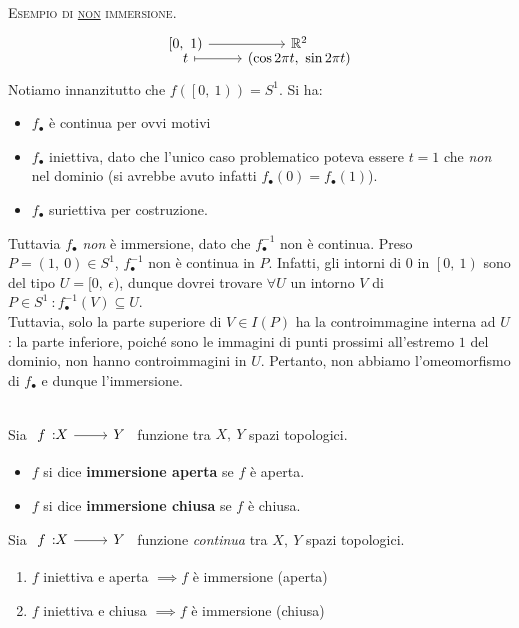 \begin{example} \textsc{Esempio di \underline{non} immersione.}
	\begin{equation}
		\funztot{\ }{\left[0,\ 1\right)}{\realset^2}{t}{\left(\cos 2\pi t,\ \sin 2\pi t\right)}
	\end{equation}
Notiamo innanzitutto che $f\left(\left[0,\ 1\right)\right)=S^{1}$. Si ha:
\begin{itemize}
\item $f_{\bullet}$ è continua per ovvi motivi
\item $f_{\bullet}$ iniettiva, dato che l'unico caso problematico poteva essere $t=1$ che \textit{non} nel dominio (si avrebbe avuto infatti $f_{\bullet}\left(0\right)=f_{\bullet}\left(1\right)$).
\item $f_{\bullet}$ suriettiva per costruzione.
\end{itemize}
Tuttavia $f_{\bullet}$ \textit{non} è immersione, dato che $f_{\bullet}^{-1}$ non è continua. Preso $P=\left(1,\ 0\right)\in S^1$, $f_{\bullet}^{-1}$ non è continua in $P$. Infatti, gli intorni di $0$ in $\left[0,\ 1\right)$ sono del tipo $U=[0,\ \epsilon)$, dunque dovrei trovare $\forall U$ un intorno $V$ di $P\in S^1\ \colon f_{\bullet}^{-1}\left(V\right)\subseteq U$.\\
Tuttavia, solo la parte superiore di $V\in I\left(P\right)$ ha la controimmagine interna ad $U$: la parte inferiore, poiché sono le immagini di punti prossimi all'estremo $1$ del dominio, non hanno controimmagini in $U$. Pertanto, non abbiamo l'omeomorfismo di $f_{\bullet}$ e dunque l'immersione.
\end{example}
\begin{define}~{}\\
Sia $\funz{f}{X}{Y}$ funzione tra $X,\ Y$ spazi topologici.
\begin{itemize}
\item $f$ si dice \textbf{immersione aperta} se $f$ è aperta.
\item $f$ si dice \textbf{immersione chiusa} se $f$ è chiusa.
\end{itemize}
\vspace{-3mm}
\end{define}
\begin{lemming}
Sia $\funz{f}{X}{Y}$ funzione \textit{continua} tra $X,\ Y$ spazi topologici.
\begin{enumerate}
\item $f$ iniettiva e aperta $\implies f$ è immersione (aperta)
\item $f$ iniettiva e chiusa $\implies f$ è immersione (chiusa)
\end{enumerate}
\vspace{-3mm}
\end{lemming}
